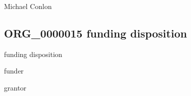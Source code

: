 \documentclass[letterpaper,10pt,english]{sphinxmanual}
\begin{document}
\begin{sphinxShadowBox}

\sphinxAtStartPar
{}
\end{sphinxShadowBox}

\begin{sphinxShadowBox}

\sphinxAtStartPar
Michael Conlon 
\end{sphinxShadowBox}
\begin{quote}

\ignorespaces \end{quote}


\subsection{ORG\_0000015 \sphinxhyphen{} funding disposition}
\label{\detokenize{doc-ORG_0000015:org-0000015-funding-disposition}}\label{\detokenize{doc-ORG_0000015:index-0}}\label{\detokenize{doc-ORG_0000015::doc}}
\begin{sphinxShadowBox}

\sphinxAtStartPar
funding disposition
\end{sphinxShadowBox}

\begin{sphinxShadowBox}

\sphinxAtStartPar
funder
\end{sphinxShadowBox}

\begin{sphinxShadowBox}

\sphinxAtStartPar
grantor
\end{sphinxShadowBox}

\begin{sphinxShadowBox}

\sphinxAtStartPar
{\hyperref[\detokenize{doc-BFO_0000016::doc}]{}}
\end{sphinxShadowBox}
\end{document}
